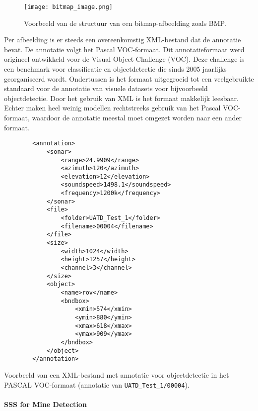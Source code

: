 \begin{figure}[H]
    \centering
    \texttt{[image: bitmap\_image.png]}
    \caption[Voorbeeld van een bitmap.]{\label{fig:bitmap_image}Voorbeeld van de structuur van een bitmap-afbeelding zoals BMP.}
\end{figure}

Per afbeelding is er steeds een overeenkomstig XML-bestand dat de annotatie bevat. De annotatie volgt het Pascal VOC-formaat. Dit annotatieformaat werd origineel ontwikkeld voor de Visual Object Challenge (VOC). Deze challenge is een benchmark voor classificatie en objectdetectie die sinds 2005 jaarlijks georganiseerd wordt. Ondertussen is het formaat uitgegroeid tot een veelgebruikte standaard voor de annotatie van visuele datasets voor bijvoorbeeld objectdetectie. Door het gebruik van XML is het formaat makkelijk leesbaar. Echter maken heel weinig modellen rechtstreeks gebruik van het Pascal VOC-formaat, waardoor de annotatie meestal moet omgezet worden naar een ander formaat. \autocite{Everingham_2009}

\begin{listing}[H]
    \begin{verbatim}
        <annotation>
            <sonar>
                <range>24.9909</range>
                <azimuth>120</azimuth>
                <elevation>12</elevation>
                <soundspeed>1498.1</soundspeed>
                <frequency>1200k</frequency>
            </sonar>
            <file>
                <folder>UATD_Test_1</folder>
                <filename>00004</filename>
            </file>
            <size>
                <width>1024</width>
                <height>1257</height>
                <channel>3</channel>
            </size>
            <object>
                <name>rov</name>
                <bndbox>
                    <xmin>574</xmin>
                    <ymin>880</ymin>
                    <xmax>618</xmax>
                    <ymax>909</ymax>
                </bndbox>
            </object>
        </annotation>
    \end{verbatim}
    \caption[PASCAL VOC-annotatie]{Voorbeeld van een XML-bestand met annotatie voor objectdetectie in het PASCAL VOC-formaat (annotatie van \texttt{UATD\_Test\_1/00004}). \autocite{Xie_2022}}
\end{listing}

\paragraph{SSS for Mine Detection}

